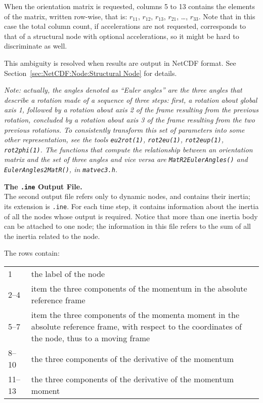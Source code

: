 When the orientation matrix is requested, columns 5 to 13
contains the elements of the matrix, written row-wise,
that is: $r_{11}$, $r_{12}$, $r_{13}$, $r_{21}$, \ldots, $r_{33}$.
Note that in this case the total column count, if accelerations
are not requested, corresponds to that of a structural node
with optional accelerations, so it might be hard to discriminate
as well.

This ambiguity is resolved when results are output in NetCDF format.
See Section~\ref{sec:NetCDF:Node:Structural Node} for details.

\emph{Note: actually, the angles denoted as ``Euler angles'' 
are the three angles that describe a rotation made of a sequence
of three steps: first, a rotation about global axis 1,
followed by a rotation about axis 2 of the frame resulting from
the previous rotation, concluded by a rotation about axis 3
of the frame resulting from the two previous rotations.
To consistently transform this set of parameters into some other
representation, see the tools
\texttt{eu2rot(1)}, \texttt{rot2eu(1)}, \texttt{rot2eup(1)}, \texttt{rot2phi(1)}.
The functions that compute the relationship between an orientation
matrix and the set of three angles and vice versa are
\texttt{MatR2EulerAngles()} and \texttt{EulerAngles2MatR()}, in \texttt{matvec3.h}.
}

\textbf{The \texttt{.ine} Output File.} \\
The second output file refers only to dynamic nodes, and contains their
inertia; its extension is \texttt{.ine}.
For each time step, it contains information about the inertia of all the
nodes whose output is required.
Notice that more than one inertia body can be attached to one node; the
information in this file refers to the sum of all the inertia related to
the node.

The rows contain: \vspace{2mm} \\
\begin{tabular}{lp{140mm}}
        \hline
	1	& the label of the node \\
	2--4	& item the three components of the momentum
		in the absolute reference frame \\
	5--7	& item the three components of the momenta moment
		in the absolute reference frame,
		with respect to the coordinates of the node, 
		thus to a moving frame \\
    	8--10	& the three components of the derivative of the momentum \\
    	11--13	& the three components of the derivative of the momentum moment \\
	\hline
\end{tabular}\vspace{2mm}\\

